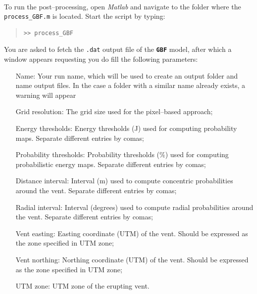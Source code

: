\documentclass[10pt,a4paper]{article}
\begin{document}
\paragraph{} To run the post--processing, open \textit{Matlab} and navigate to the folder where the \texttt{process\_GBF.m} is located. Start the script by typing:

\begin{quote}
\begin{verbatim}
>> process_GBF
\end{verbatim}
\end{quote}

You are asked to fetch the \texttt{.dat} output file of the \textbf{\texttt{\textsf{\color{namecolor}GBF}}} model, after which a window appears requesting you do fill the following parameters:
\begin{itemize}[leftmargin=4cm,labelindent=16pt, itemsep=0.25pt]
	\item[\textsf{\color{namecolor}Name:}] Your run name, which will be used to create an output folder and name output files. In the case a folder with a similar name already exists, a warning will appear
	\item[\textsf{\color{namecolor}Grid resolution:}] The grid size used for the pixel--based approach;
	\item[\textsf{\color{namecolor}Energy thresholds:}] Energy thresholds (J) used for computing probability maps. Separate different entries by comas;
	\item[\textsf{\color{namecolor}Probability thresholds:}] Probability thresholds (\%) used for computing probabilistic energy maps. Separate different entries by comas;
	\item[\textsf{\color{namecolor}Distance interval:}] Interval (m) used to compute concentric probabilities around the vent. Separate different entries by comas;
	\item[\textsf{\color{namecolor}Radial interval:}] Interval (degrees) used to compute radial probabilities around the vent. Separate different entries by comas;
	\item[\textsf{\color{namecolor}Vent easting:}] Easting coordinate (UTM) of the vent. Should be expressed as the zone specified in  \textsf{\color{namecolor}UTM zone};
	\item[\textsf{\color{namecolor}Vent northing:}] Northing coordinate (UTM) of the vent. Should be expressed as the zone specified in  \textsf{\color{namecolor}UTM zone};
	\item[\textsf{\color{namecolor}UTM zone:}] UTM zone of the erupting vent.
\end{itemize}
\end{document}
